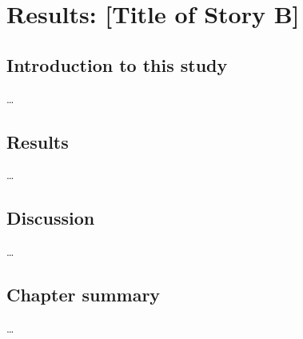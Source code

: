 \chapter{Results: [Title of Story B]}
\label{ch:resultsB}

\section{Introduction to this study}
\label{sec:resB-intro}
\ldots{}

\section{Results}
\label{sec:resB-results}
\ldots{}

\section{Discussion}
\label{sec:resB-disc}
\ldots{}

\section{Chapter summary}
\label{sec:resB-sum}
\ldots{}
